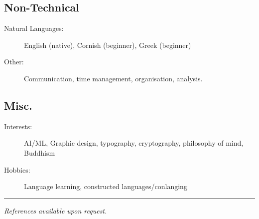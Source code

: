 \documentclass[10pt,a4paper]{article}
\newenvironment{indentsection}[1]%
{\begin{list}{}%
	{\setlength{\leftmargin}{#1}}%
	\item[]%
}
{\end{list}}
\begin{document}
\subsection*{Non-Technical}
\begin{indentsection}{\parindent}
\begin{description}
	\item[Natural Languages:]
	English (native), Cornish (beginner), Greek (beginner)
    \item[Other:]
    Communication, time management, organisation, analysis.
\end{description}
\end{indentsection}

\subsection*{Misc.}
\begin{indentsection}{\parindent}
\begin{description}
	\item[Interests:]
	AI/ML, Graphic design, typography, cryptography, philosophy of mind, Buddhism
	\item[Hobbies:]
	Language learning, constructed languages/conlanging
\end{description}
\end{indentsection}

\vspace{1em}
\hrule
\vspace{2em}

\begin{center}
    \color{gray}\small\emph{References available upon request.}
\end{center}
\thispagestyle{empty}
\end{document}
